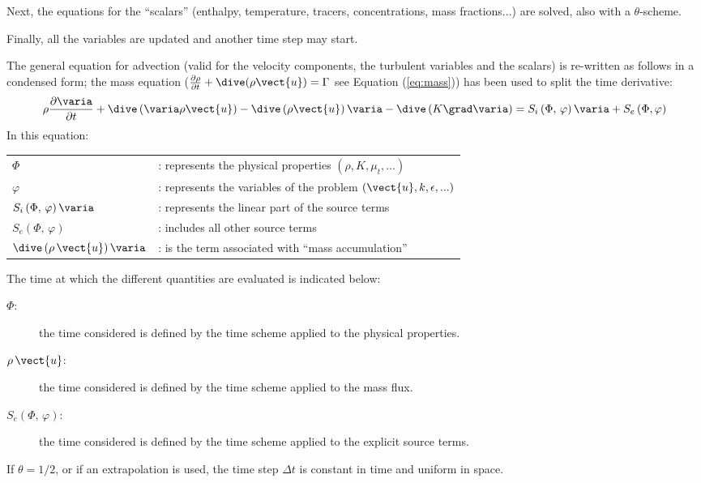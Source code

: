 Next, the equations for the ``scalars'' (enthalpy, temperature, tracers,
concentrations, mass fractions...) are solved, also with a $\theta$-scheme.

Finally, all the variables are updated and another time step may start.

The general equation for advection (valid for the velocity components, the
turbulent variables and the scalars) is re-written as follows in a condensed
form; the mass equation ($\frac{\partial \rho } {\partial t}+ \dive(\rho
\vect{u}) = \Gamma$ see Equation (\ref{eq:mass})) has been used to split the time derivative:
%
\begin{equation}\label{eq:transport_eq_scalar}
\rho \frac {\partial \varia}{\partial t} + \dive  \left( \varia \rho \vect{u} \right) 
- \dive \left(\rho \vect{u} \right) \varia
- \dive \left(K \grad \varia \right) = S_{i}\left(\Phi, \, \varphi\right) \varia + S_{e}\left(\Phi,\varphi \right) 
\end{equation}
In this equation:

\begin{tabular}{ll}
$\Phi$ & : represents the physical properties $(\rho,K,\mu_{t},...)$ \\
$\varphi$ & : represents the variables of the problem $(\vect{u}%
,k,\epsilon,...)$ \\
$S_{i}\left(\Phi, \, \varphi \right) \varia$ & : represents the linear part of the source terms
\\
$S_{e} \left(\Phi, \, \varphi \right)$ & : includes all other source terms \\
$\dive \left(\rho\,\vect{u}\right) \varia$ & : is the term associated with ``mass
accumulation''%
\end{tabular}

The time at which the different quantities are evaluated is indicated below:
%
\begin{description}
\item[$\Phi$:] the time considered is defined by the time scheme applied
to the physical properties.
\item[$\rho\,\vect{u}$:] the time considered is defined by the
time scheme applied to the mass flux.
\item[$S_{e}\left(\Phi, \, \varphi \right)$:] the time considered is defined by the time
scheme applied to the explicit source terms.
\end{description}

If $\theta=1/2$, or if an extrapolation is used, the time step $\Delta t$ is
constant in time and uniform in space.

